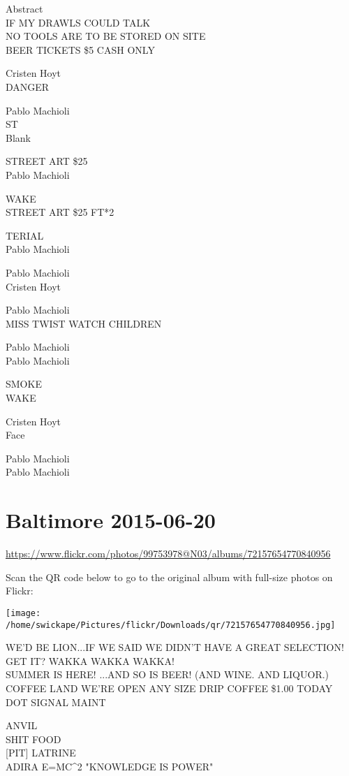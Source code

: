 \documentclass[10pt,letterpaper]{article}
\begin{document}
Abstract\\
IF MY DRAWLS COULD TALK\\
NO TOOLS ARE TO BE STORED ON SITE\\
BEER TICKETS \$5 CASH ONLY

Cristen Hoyt\\
DANGER

Pablo Machioli\\
ST\\
Blank

STREET ART \$25\\
Pablo Machioli

WAKE\\
STREET ART \$25 FT*2

TERIAL\\
Pablo Machioli

Pablo Machioli\\
Cristen Hoyt

Pablo Machioli\\
MISS TWIST WATCH CHILDREN

Pablo Machioli\\
Pablo Machioli

SMOKE\\
WAKE

Cristen Hoyt\\
Face

Pablo Machioli\\
Pablo Machioli


\section*{Baltimore 2015-06-20}

\url{https://www.flickr.com/photos/99753978@N03/albums/72157654770840956}

Scan the QR code below to go to the original album with full-size photos on Flickr:

\texttt{[image: /home/swickape/Pictures/flickr/Downloads/qr/72157654770840956.jpg]}


WE'D BE LION...IF WE SAID WE DIDN'T HAVE A GREAT SELECTION!  GET IT?  WAKKA WAKKA WAKKA!\\
SUMMER IS HERE!  ...AND SO IS BEER!  (AND WINE.  AND LIQUOR.)\\
COFFEE LAND WE'RE OPEN ANY SIZE DRIP COFFEE \$1.00 TODAY\\
DOT SIGNAL MAINT

ANVIL\\
SHIT FOOD\\
{[}PIT{]} LATRINE\\
ADIRA E=MC\^{}2 "KNOWLEDGE IS POWER"
\end{document}
